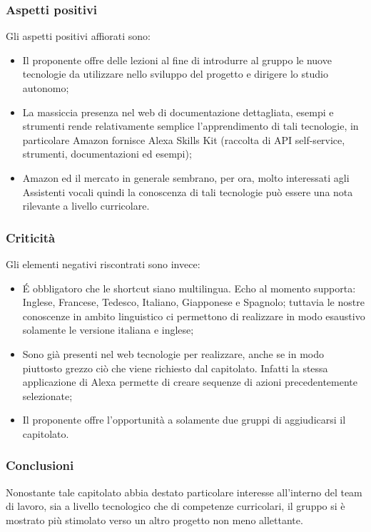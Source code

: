 \subsubsection{Aspetti positivi}
Gli aspetti positivi affiorati sono:
\begin{itemize}
    \item Il proponente offre delle lezioni al fine di introdurre al gruppo le nuove tecnologie da utilizzare nello sviluppo del progetto e dirigere lo studio autonomo;
    \item La massiccia presenza nel web di documentazione dettagliata, esempi e strumenti rende relativamente semplice l'apprendimento di tali tecnologie, in particolare Amazon fornisce Alexa Skills Kit (raccolta di API self-service, strumenti, documentazioni ed esempi);
    \item Amazon ed il mercato in generale sembrano, per ora, molto interessati agli Assistenti vocali quindi la conoscenza di tali tecnologie può essere una nota rilevante a livello curricolare.
\end{itemize}
\subsubsection{Criticità}
Gli elementi negativi riscontrati sono invece:
\begin{itemize}
    \item É obbligatoro che le shortcut siano multilingua. Echo al momento supporta: Inglese, Francese, Tedesco, Italiano, Giapponese e Spagnolo; tuttavia le nostre conoscenze in ambito linguistico ci permettono di realizzare in modo esaustivo solamente le versione italiana e inglese;
    \item Sono già presenti nel web tecnologie per realizzare, anche se in modo piuttosto grezzo ciò che viene richiesto dal capitolato. Infatti la stessa applicazione di Alexa permette di creare sequenze di azioni precedentemente selezionate;
    \item Il proponente offre l'opportunità a solamente due gruppi di aggiudicarsi il capitolato.
\end{itemize}
\subsubsection{Conclusioni}
Nonostante tale capitolato abbia destato particolare interesse all'interno del team di lavoro, sia a livello tecnologico che di competenze curricolari, il gruppo si è mostrato più stimolato verso un altro progetto non meno allettante.

